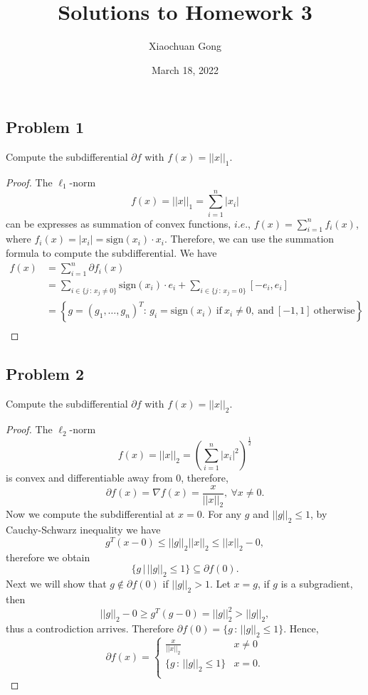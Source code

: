 \documentclass[11pt]{article}
\title{Solutions to Homework 3}
\author{Xiaochuan Gong}
\date{March 18, 2022}
\begin{document}
\maketitle

\subsection*{Problem 1}
Compute the subdifferential $\partial f$ with $f(x)=||x||_1$.

\begin{proof}
The $\ell_1$-norm 
\[
f(x)=||x||_1=\sum\limits_{i=1}^{n}|x_i|
\]
can be expresses as summation of convex functions, $i.e.$, $f(x) = \sum\limits_{i=1}^{n}f_i(x)$, where $f_i(x) = |x_i| = \text{sign}(x_i)\cdot x_i$. Therefore, we can use the summation formula to compute the subdifferential. We have 
\begin{equation*}
    \begin{aligned}
        f(x) & =\sum\limits_{i=1}^{n}\partial f_i(x) \\
             & =\sum\limits_{i\in\{j\,:\, x_j\neq0\}}\text{sign}(x_i)\cdot e_i+ \sum\limits_{i\in\{j\,:\,x_j=0\}}[-e_i, e_i]\\
             & =\left\{g=(g_1,\dots,g_n)^{T}:\, g_i=\text{sign}(x_i)
             \ \text{if}\ x_i\neq0, \ \text{and}\ [-1,1]\ \text{otherwise}\right\}\\
    \end{aligned}
\end{equation*}

\end{proof}

\subsection*{Problem 2}
Compute the subdifferential $\partial f$ with $f(x)=||x||_2$.

\begin{proof}
The $\ell_2$-norm 
\[
f(x) = ||x||_2 = \left(\sum\limits_{i=1}^{n}|x_i|^2\right)^{\frac{1}{2}}
\]
is convex and differentiable away from 0, therefore, 
\[
\partial f(x) = \nabla f(x) = \frac{x}{||x||_2}, \ \forall x \neq 0.
\]
Now we compute the subdifferential at $x=0$. For any $g$ and $||g||_2\leq1$, by Cauchy-Schwarz inequality we have
\[
g^{T}(x-0)\leq||g||_2||x||_2 \leq ||x||_2-0,
\]
therefore we obtain
\[
\{g\,|\,||g||_2 \leq 1\} \subseteq \partial f(0).
\]
Next we will show that $g \notin \partial f(0)$ if $||g||_2 > 1$. Let $x=g$, if $g$ is a subgradient, then
\[
||g||_2-0\geq g^{T}(g-0) = ||g||_2^2 > ||g||_2,
\]
thus a controdiction arrives. Therefore $\partial f(0) = \{g\, :\, ||g||_2 \leq 1\}.$ Hence, 
\begin{equation*}
	\partial f(x) = \begin{cases}
	 	\frac{x}{||x||_2}          & x \neq 0 \\
		\{g\, :\, ||g||_2 \leq 1\} & x=0.     \\
	\end{cases}
\end{equation*}
\end{proof}
\end{document}
